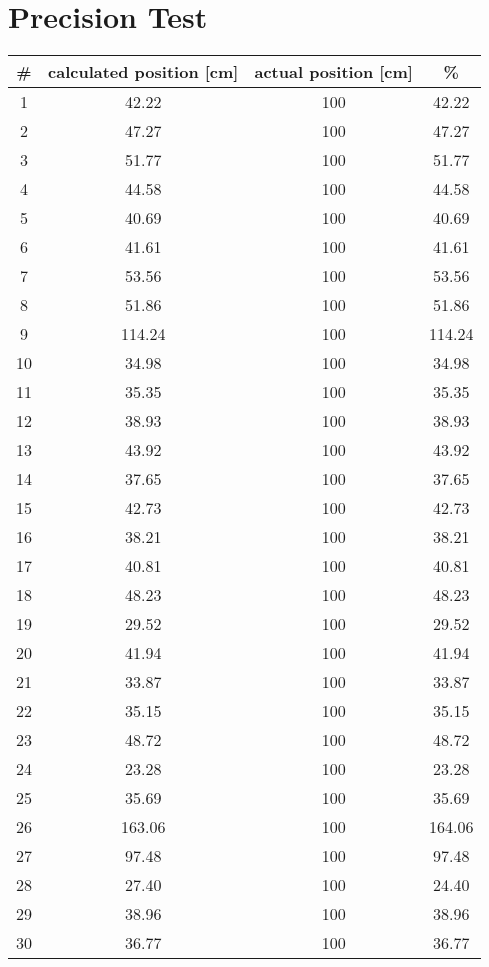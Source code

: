 \chapter{Precision Test}\label{app:precision-tests}
\begin{tabular}{|c|c|c|c|}
 \hline 
 \# & calculated position [cm] & actual position [cm] & \% \\ 
 \hline 
 1  & 42.22 & 100  & 42.22  \\ \hline
 2  & 47.27 & 100  & 47.27  \\ \hline
 3  & 51.77 & 100  & 51.77  \\ \hline
 4  & 44.58 & 100  & 44.58  \\ \hline
 5  & 40.69 & 100  & 40.69  \\ \hline
 6  & 41.61 & 100  & 41.61  \\ \hline
 7  & 53.56 & 100  & 53.56  \\ \hline
 8  & 51.86 & 100  & 51.86  \\ \hline
 9  & 114.24& 100  & 114.24 \\ \hline
 10 & 34.98 & 100  & 34.98  \\ \hline
 11 & 35.35 & 100  & 35.35  \\ \hline
 12 & 38.93 & 100  & 38.93  \\ \hline
 13 & 43.92 & 100  & 43.92  \\ \hline
 14 & 37.65 & 100  & 37.65  \\ \hline
 15 & 42.73 & 100  & 42.73  \\ \hline
 16 & 38.21 & 100  & 38.21  \\ \hline
 17 & 40.81 & 100  & 40.81  \\ \hline
 18 & 48.23 & 100  & 48.23  \\ \hline
 19 & 29.52 & 100  & 29.52  \\ \hline
 20 & 41.94 & 100  & 41.94  \\ \hline
 21 & 33.87 & 100  & 33.87  \\ \hline
 22 & 35.15 & 100  & 35.15  \\ \hline
 23 & 48.72 & 100  & 48.72  \\ \hline
 24 & 23.28 & 100  & 23.28  \\ \hline
 25 & 35.69 & 100  & 35.69  \\ \hline
 26 & 163.06& 100  & 164.06 \\ \hline
 27 & 97.48 & 100  & 97.48  \\ \hline
 28 & 27.40 & 100  & 24.40  \\ \hline
 29 & 38.96 & 100  & 38.96  \\ \hline
 30 & 36.77 & 100  & 36.77  \\ \hline
 \end{tabular}
 

